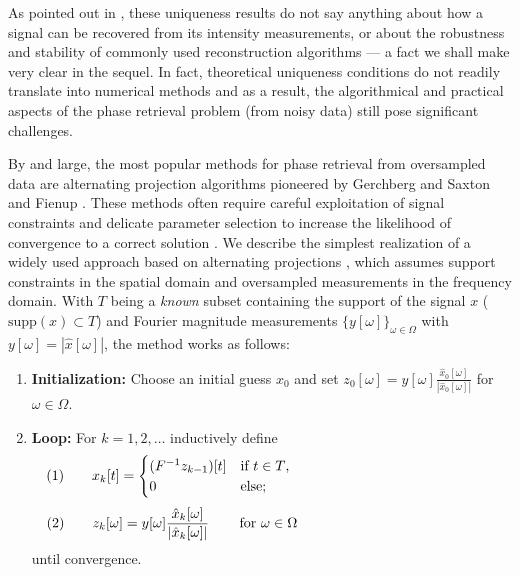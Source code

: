 \documentclass[11pt]{article}
\newcommand{\<}{\langle}
\renewcommand{\>}{\rangle}
\numberwithin{equation}{section}
\begin{document}
As pointed out in \cite{LBL02}, these uniqueness results do not say
anything about how a signal can be recovered from its intensity
measurements, or about the robustness and stability of commonly used
reconstruction algorithms --- a fact we shall make very clear in the
sequel. In fact, theoretical uniqueness conditions do not readily
translate into numerical methods and as a result, the algorithmical
and practical aspects of the phase retrieval problem (from noisy data)
still pose significant challenges.



By and large, the most popular methods for phase retrieval from
oversampled data are alternating projection algorithms pioneered by
Gerchberg and Saxton \cite{GS72} and Fienup \cite{Fie78,Fie82}.  These
methods often require careful exploitation of signal constraints and
delicate parameter selection to increase the likelihood of convergence
to a correct solution \cite{NPC03,Mar07,CMW07,Mar07a}. We describe the
simplest realization of a widely used approach based on alternating
projections \cite{MKS00}, which assumes support constraints in the
spatial domain and oversampled measurements in the frequency domain.
With $T$ being a {\em known} subset containing the support of the
signal $x$ ($\text{supp}(x) \subset T$) and Fourier magnitude
measurements $\{y[\omega]\}_{\omega \in \Omega}$ with $y[\omega] =
|\hat{x}[\omega]|$, the method works as follows:
\begin{enumerate}
\item {\bf Initialization:} Choose an initial guess $x_0$ and set
  $z_0[\omega] = y[\omega]
  \frac{\hat{x}_0[\omega]}{|\hat{x}_0[\omega]|}$ for
  $\omega \in \Omega$. 
\item {\bf Loop:} For $k=1,2,\dots$ inductively define 
$$ (1) \qquad x_k[t] = 
\begin{cases}
(F^{-1} z_{k-1})[t] & \text{if $t \in T$,} \\
0               & \text{else;}
\end{cases} \hspace*{52mm}
$$
$$(2) \qquad
z_{k}[\omega] = y[\omega] \frac{\hat{x}_k[\omega]}{|\hat{x}_k[\omega]|} 
\qquad \,\text{for $\omega \in \Omega$}
\hspace*{50mm}$$
until convergence.
\end{enumerate}
\end{document}
